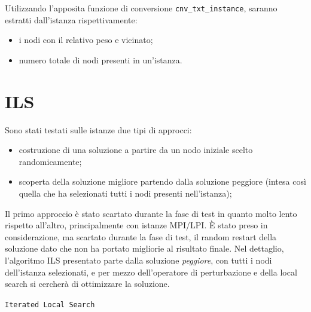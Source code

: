 \documentclass[11pt]{article}
\begin{document}
Utilizzando l'apposita funzione di conversione \verb|cnv_txt_instance|, saranno estratti dall'istanza rispettivamente:
\begin{itemize}
\item{i nodi con il relativo peso e vicinato;}
\item{numero totale di nodi presenti in un'istanza.}
\end{itemize}

\pagebreak

\section{ILS}

Sono stati testati sulle istanze due tipi di approcci:

\begin{itemize}
\item{costruzione di una soluzione a partire da un nodo iniziale scelto randomicamente;}
\item {scoperta della soluzione migliore partendo dalla soluzione peggiore (intesa così quella che ha selezionati tutti i nodi presenti nell'istanza);}
\end{itemize}

Il primo approccio è stato scartato durante la fase di test in quanto molto lento rispetto all'altro, principalmente con istanze MPI/LPI. È stato preso in considerazione, ma scartato durante la fase di test, il random restart della soluzione dato che non ha portato migliorie al risultato finale.
Nel dettaglio, l'algoritmo ILS presentato parte dalla soluzione \textit{peggiore}, con tutti i nodi dell'istanza selezionati, e per mezzo dell'operatore di perturbazione e della local search si cercherà di ottimizzare la soluzione.

\begin{algorithm}
\caption{\texttt{Iterated Local Search}}
\begin{algorithmic}


\EndWhile
{}
\end{algorithmic}
\end{algorithm}
\end{document}
